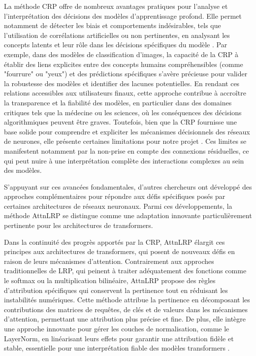 \documentclass[runningheads]{llncs}
\begin{document}
La méthode CRP offre de nombreux avantages pratiques pour l'analyse et l'interprétation des décisions des modèles d'apprentissage profond. Elle permet notamment de détecter les biais et comportements indésirables, tels que l’utilisation de corrélations artificielles ou non pertinentes, en analysant les concepts latents et leur rôle dans les décisions spécifiques du modèle \autocite{Achtibat2023}. Par exemple, dans des modèles de classification d'images, la capacité de la CRP à établir des liens explicites entre des concepts humains compréhensibles (comme "fourrure" ou "yeux") et des prédictions spécifiques s'avère précieuse pour valider la robustesse des modèles et identifier des lacunes potentielles. En rendant ces relations accessibles aux utilisateurs finaux, cette approche contribue à accroître la transparence et la fiabilité des modèles, en particulier dans des domaines critiques tels que la médecine ou les sciences, où les conséquences des décisions algorithmiques peuvent être graves. Toutefois, bien que la CRP fournisse une base solide pour comprendre et expliciter les mécanismes décisionnels des réseaux de neurones, elle présente certaines limitations pour notre projet \autocite{Achtibat2023}. Ces limites se manifestent notamment par la non-prise en compte des connexions résiduelles, ce qui peut nuire à une interprétation complète des interactions complexes au sein des modèles.

S'appuyant sur ces avancées fondamentales, d'autres chercheurs ont développé des approches complémentaires pour répondre aux défis spécifiques posés par certaines architectures de réseaux neuronaux. Parmi ces développements, la méthode AttnLRP se distingue comme une adaptation innovante particulièrement pertinente pour les architectures de transformers.
\bigskip

Dans la continuité des progrès apportés par la CRP, AttnLRP \autocite{pmlr-v235-achtibat24a} élargit ces principes aux architectures de transformers, qui posent de nouveaux défis en raison de leurs mécanismes d'attention. Contrairement aux approches traditionnelles de LRP, qui peinent à traiter adéquatement des fonctions comme le softmax ou la multiplication bilinéaire, AttnLRP propose des règles d'attribution spécifiques qui conservent la pertinence tout en réduisant les instabilités numériques. Cette méthode attribue la pertinence en décomposant les contributions des matrices de requêtes, de clés et de valeurs dans les mécanismes d’attention, permettant une attribution plus précise et fine. De plus, elle intègre une approche innovante pour gérer les couches de normalisation, comme le LayerNorm, en linéarisant leurs effets pour garantir une attribution fidèle et stable, essentielle pour une interprétation fiable des modèles transformers \autocite{pmlr-v235-achtibat24a}.
\end{document}

